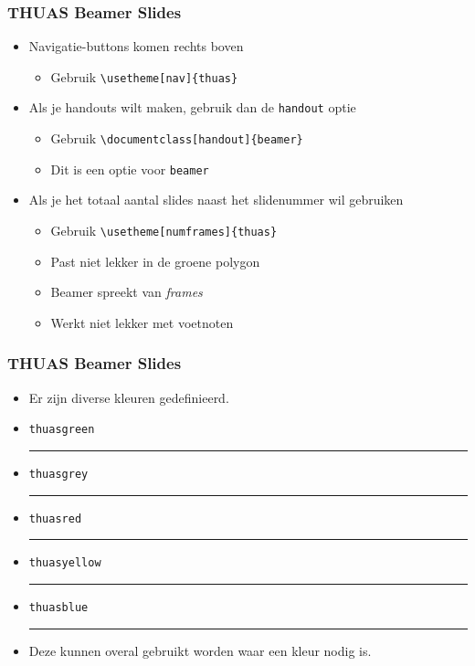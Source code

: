 \documentclass[fleqn,aspectratio=169,dutch,10pt]{beamer}
\begin{document}
\begin{frame}[fragile]
\frametitle{THUAS Beamer Slides}
\begin{itemize}
\item Navigatie-buttons komen rechts boven
\begin{itemize}
\item Gebruik \lstinline|\usetheme[nav]{thuas}|
\end{itemize}
\item Als je handouts wilt maken, gebruik dan de \lstinline|handout| optie
\begin{itemize}
\item Gebruik \lstinline|\documentclass[handout]{beamer}|
\item Dit is een optie voor \lstinline|beamer|
\end{itemize}
\item Als je het totaal aantal slides naast het slidenummer wil gebruiken
\begin{itemize}
\item Gebruik \lstinline|\usetheme[numframes]{thuas}|
\item Past niet lekker in de groene polygon
\item Beamer spreekt van \textsl{frames}
\item Werkt niet lekker met voetnoten
\end{itemize}
\end{itemize}
\end{frame}


\begin{frame}[fragile]
\frametitle{THUAS Beamer Slides}
\begin{itemize}
\item Er zijn diverse kleuren gedefinieerd.
\bigskip
\item \lstinline|thuasgreen| \textcolor{thuasgreen}{\rule{5pt}{5pt}}
\item \lstinline|thuasgrey| \textcolor{thuasgrey}{\rule{5pt}{5pt}}
\item \lstinline|thuasred| \textcolor{thuasred}{\rule{5pt}{5pt}}
\item \lstinline|thuasyellow| \textcolor{thuasyellow}{\rule{5pt}{5pt}}
\item \lstinline|thuasblue| \textcolor{thuasblue}{\rule{5pt}{5pt}}
\bigskip
\item Deze kunnen overal gebruikt worden waar een kleur nodig is.
\end{itemize}
\end{frame}
\end{document}
